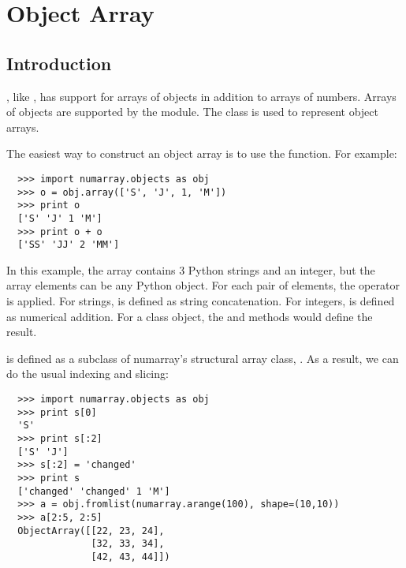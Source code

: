 \chapter{Object Array}
\label{cha:object-array}

\section{Introduction}
\label{sec:objectarray-intro}

, like , has support for arrays of objects in
addition to arrays of numbers.  Arrays of objects are supported by the
 module.  The  
class is used to represent object arrays.  

The easiest way to construct an object array is to use the
 function.  For example:

\begin{verbatim}
  >>> import numarray.objects as obj
  >>> o = obj.array(['S', 'J', 1, 'M'])
  >>> print o
  ['S' 'J' 1 'M']
  >>> print o + o
  ['SS' 'JJ' 2 'MM']
\end{verbatim}

In this example, the array contains 3 Python strings and an integer, but the
array elements can be any Python object.  For each pair of elements, the
 operator is applied.  For strings,  is defined as
string concatenation.  For integers,  is defined as numerical
addition.  For a class object, the  and 
methods would define the result.

 is defined as a subclass of numarray's structural array
class, .  As a result, we can do the usual indexing and slicing:

\begin{verbatim}
  >>> import numarray.objects as obj
  >>> print s[0]
  'S'
  >>> print s[:2]
  ['S' 'J']
  >>> s[:2] = 'changed'
  >>> print s
  ['changed' 'changed' 1 'M']
  >>> a = obj.fromlist(numarray.arange(100), shape=(10,10))
  >>> a[2:5, 2:5]
  ObjectArray([[22, 23, 24],
               [32, 33, 34],
               [42, 43, 44]])
\end{verbatim}


